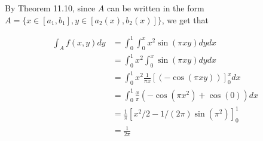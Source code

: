
By Theorem 11.10, since $ A$ can be written in the form $ A = \{ x \in [a_1,b_1], y \in [a_2(x),
b_2(x)	] \} $, we get that 

\begin{align*}
    \int_{A}^{} f(x,y) dy &= \int_{0}^{1} \int_{0}^{x} x^2 \sin (\pi xy) dy dx\\
			  &= \int_{0}^{1} x^2 \int_{0}^{x} \sin(\pi x y) dy dx\\
			  &= \int_{0}^{1} x^2 \frac{1}{\pi x}\left[ (-\cos (\pi xy)) \right]_{0}^{x}
			  dx\\
			  &= \int_{0}^{1} \frac{x}{\pi} (-\cos(\pi x^2) + \cos(0)) dx\\
			  &= \frac{1}{\pi} \left[ x^2/2 - 1/(2\pi) \sin (\pi ^2) \right]_{0}^{1} \\
			  &= \frac{1}{2\pi} 
\end{align*}
